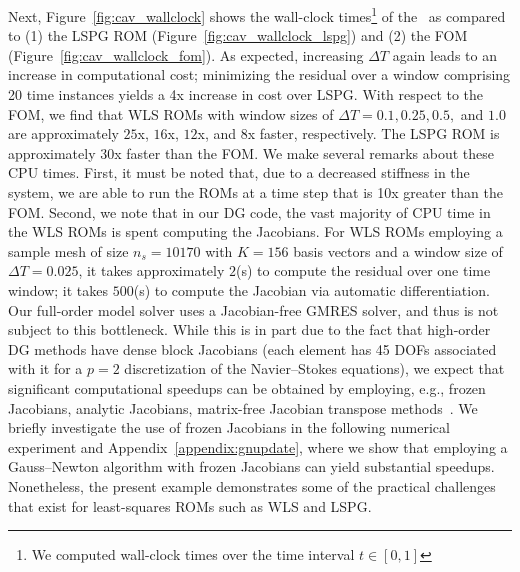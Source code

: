 Next, Figure~\ref{fig:cav_wallclock}
shows the wall-clock times\footnote{We computed wall-clock times over the time interval $t \in [0,1]$} of the \methodAcronymROMs\ as compared to (1) the LSPG ROM (Figure~\ref{fig:cav_wallclock_lspg}) and (2) the FOM (Figure~\ref{fig:cav_wallclock_fom}).  As expected, increasing $\Delta T$ again leads to an increase in computational cost; minimizing the residual over a window comprising 20 time instances yields a 4x increase in cost over LSPG. With respect to the FOM, we find that WLS ROMs with window sizes of $\Delta T = 0.1, 0.25, 0.5,$  and $1.0$ are approximately $25$x, $16$x, $12$x, and $8$x faster, respectively. The LSPG ROM is approximately 30x faster than the FOM.  We make several remarks about these CPU times. First, it must be noted that, due to a decreased stiffness in the system, we are able to run the ROMs at a time step that is 10x greater than the FOM. Second, we note that in our DG code, the vast majority of CPU time in the WLS ROMs is spent computing the Jacobians. For WLS ROMs employing a sample mesh of size $n_s=10170$ with $K=156$ basis vectors and a window size of $\Delta T = 0.025$, it takes approximately $2$(s) to compute the residual over one time window; it takes $500$(s) to compute the Jacobian via automatic differentiation. Our full-order model solver uses a Jacobian-free GMRES solver, and thus is not subject to this bottleneck. While this is in part due to the fact that high-order DG methods have dense block Jacobians (each element has 45 DOFs associated with it for a $p=2$ discretization of the Navier--Stokes equations), we expect that significant computational speedups can be obtained by employing, e.g., frozen Jacobians, analytic Jacobians, matrix-free Jacobian transpose methods~\cite{doi:10.2514/6.2016-0833}. We briefly investigate the use of frozen Jacobians in the following numerical experiment and Appendix~\ref{appendix:gnupdate}, where we show that employing a Gauss--Newton algorithm with frozen Jacobians can yield substantial speedups. Nonetheless, the present example demonstrates some of the practical challenges that exist for least-squares ROMs such as WLS and LSPG. 

